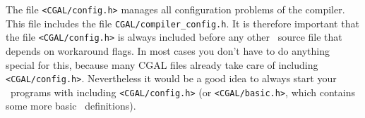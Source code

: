 The file \texttt{<CGAL/config.h>} manages all configuration problems of the compiler.
This file includes the file \texttt{CGAL/compiler\_config.h}.
It is therefore important that the file \texttt{<CGAL/config.h>} is always included
before any other \cgal\ source file that depends on workaround flags. In most cases
you don't have to do anything special for this, because many CGAL files
already take care of including \texttt{<CGAL/config.h>}. Nevertheless it would be a
good idea to always start your \cgal\ programs with including
\texttt{<CGAL/config.h>} (or \texttt{<CGAL/basic.h>}, which contains some more basic
\cgal\ definitions).

